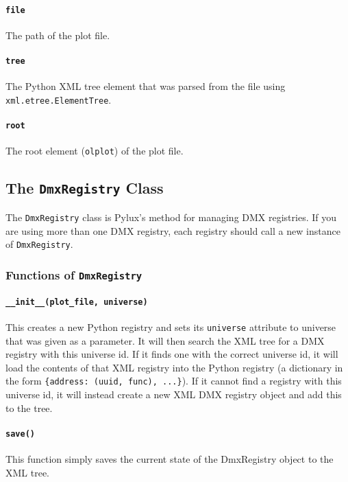 \documentclass[a4paper]{article}
\begin{document}
\paragraph{\texttt{file}}
The path of the plot file.

\paragraph{\texttt{tree}}
The Python XML tree element that was parsed from the file using 
\texttt{xml.etree.ElementTree}.

\paragraph{\texttt{root}}
The root element (\texttt{olplot}) of the plot file.

\subsection{The \texttt{DmxRegistry} Class}
The \texttt{DmxRegistry} class is Pylux's method for managing DMX registries. 
If you are using more than one DMX registry, each registry should call a new 
instance of \texttt{DmxRegistry}.

\subsubsection{Functions of \texttt{DmxRegistry}}

\paragraph{\texttt{\_\_init\_\_(plot\_file, universe)}}
This creates a new Python registry and sets its \texttt{universe} attribute 
to universe that was given as a parameter. It will then search the XML tree 
for a DMX registry with this universe id. If it finds one with the correct 
universe id, it will load the contents of that XML registry into the Python 
registry (a dictionary in the form \texttt{\{address: (uuid, func), ...\}}).
If it cannot find a registry with this universe id, it will instead create a 
new XML DMX registry object and add this to the tree.

\paragraph{\texttt{save()}}
This function simply saves the current state of the DmxRegistry object to the 
XML tree. 
\end{document}
